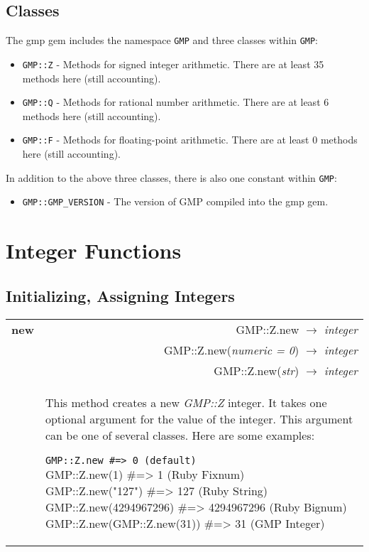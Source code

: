 \documentclass[pdftex,10pt]{article}
\newlength{\methwidth}
\newlength{\defnwidth}
\begin{document}
\subsection{Classes}
The gmp gem includes the namespace \texttt{GMP} and three classes within \texttt{GMP}:
\begin{itemize}
  \item \texttt{GMP::Z} - Methods for signed integer arithmetic. There are at least 35
    methods here (still accounting).
  \item \texttt{GMP::Q} - Methods for rational number arithmetic. There are at least 6
    methods here (still accounting).
  \item \texttt{GMP::F} - Methods for floating-point arithmetic. There are at least 0
    methods here (still accounting).
\end{itemize}

In addition to the above three classes, there is also one constant within \texttt{GMP}:
\begin{itemize}
  \item \texttt{GMP::GMP\_VERSION} - The version of GMP compiled into the gmp gem.
\end{itemize}

\section{Integer Functions}

\subsection{Initializing, Assigning Integers}

\begin{tabular}{p{\methwidth} l r}
\toprule
\textbf{new} & & GMP::Z.new $\rightarrow$ \textit{integer} \\
& & GMP::Z.new(\textit{numeric = 0}) $\rightarrow$ \textit{integer} \\
& & GMP::Z.new(\textit{str}) $\rightarrow$ \textit{integer} \\
\cmidrule(r){2-3}
& \multicolumn{2}{p{\defnwidth}}{
  This method creates a new \textit{GMP::Z} integer. It takes one optional argument for
  the value of the integer. This argument can be one of several classes. Here are some
  examples:\newline
  
  \texttt{GMP::Z.new                  \#=> 0           (default)}\newline
  GMP::Z.new(1)               \#=> 1           (Ruby Fixnum)\newline
  GMP::Z.new("127")           \#=> 127         (Ruby String)\newline
  GMP::Z.new(4294967296)      \#=> 4294967296  (Ruby Bignum)\newline
  GMP::Z.new(GMP::Z.new(31))  \#=> 31          (GMP Integer)
}
\end{tabular}
\newline\newline
\end{document}
